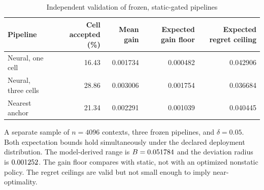 \begin{table}[t]
\centering\small
\caption{Independent validation of frozen, static-gated pipelines}\label{tab:r13-validation}
\begin{tabular}{lrrrr}\toprule
Pipeline & Cell accepted (\%) & Mean gain & Expected gain floor & Expected regret ceiling \\\midrule
Neural, one cell & 16.43 & 0.001734 & 0.000482 & 0.042906 \\
Neural, three cells & 28.86 & 0.003006 & 0.001754 & 0.036684 \\
Nearest anchor & 21.34 & 0.002291 & 0.001039 & 0.040445 \\
\bottomrule\end{tabular}
\par\smallskip\begin{minipage}{.96\textwidth}\footnotesize A separate sample of $n=4096$ contexts, three frozen pipelines, and $\delta=0.05$. Both expectation bounds hold simultaneously under the declared deployment distribution. The model-derived range is $B=0.051784$ and the deviation radius is $0.001252$. The gain floor compares with static, not with an optimized nonstatic policy. The regret ceilings are valid but not small enough to imply near-optimality.\end{minipage}
\end{table}
